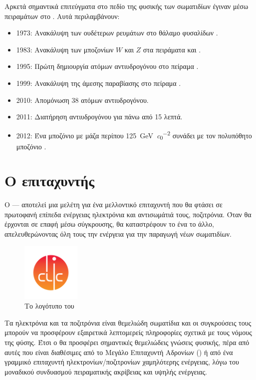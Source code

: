 Αρκετά σημαντικά επιτεύγματα στο πεδίο της φυσικής των σωματιδίων έγιναν μέσω πειραμάτων στο . Αυτά περιλαμβάνουν:
\begin{itemize}
\item 1973: Ανακάλυψη των ουδέτερων ρευμάτων στο θάλαμο φυσαλίδων .
\item 1983: Ανακάλυψη των μποζονίων $W$ και $Z$ στα πειράματα  και .
\item 1995: Πρώτη δημιουργία ατόμων αντιυδρογόνου στο πείραμα .
\item 1999: Ανακάλυψη της άμεσης παραβίασης  στο πείραμα .
\item 2010: Απομόνωση 38 ατόμων αντιυδρογόνου.
\item 2011: Διατήρηση αντιυδρογόνου για πάνω από 15 λεπτά.
\item 2012: Ένα μποζόνιο με μάζα περίπου \SI[per-mode = symbol]{125}{\GeV \per  \clight \squared} συνάδει με τον πολυπόθητο μποζόνιο .
\end{itemize}


\section{Ο επιταχυντής }


Ο  --- αποτελεί μια μελέτη για ένα μελλοντικό επιταχυντή που θα φτάσει σε πρωτοφανή επίπεδα ενέργειας ηλεκτρόνια και αντισωμάτιά τους, ποζιτρόνια. 
Όταν θα έρχονται σε επαφή μέσω σύγκρουσης, θα καταστρέφουν το ένα το άλλο, απελευθερώνοντας όλη τους την ενέργεια για την παραγωγή νέων σωματιδίων.

\begin{figure}[b]
\includegraphics[trim={12mm 12mm 12mm 12mm},clip=true,width=0.25\textwidth]{images/CLIClogo}
\centering
\caption{Το λογότυπο του }
\label{img:CLIClogo}
\end{figure}

Τα ηλεκτρόνια και τα ποζιτρόνια είναι θεμελιώδη σωματίδια και οι συγκρούσεις τους μπορούν να προσφέρουν εξαιρετικά λεπτομερείς πληροφορίες σχετικά με τους νόμους της φύσης. 
Έτσι ο  θα προσφέρει σημαντικές θεμελιώδεις γνώσεις φυσικής, πέρα από αυτές που είναι διαθέσιμες από το Μεγάλο Επιταχυντή Αδρονίων () ή από ένα γραμμικό επιταχυντή ηλεκτρονίων/ποζιτρονίων χαμηλότερης ενέργειας, λόγω του μοναδικού συνδυασμού πειραματικής ακρίβειας και υψηλής ενέργειας.

